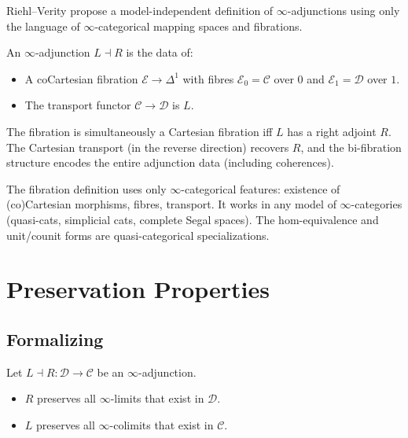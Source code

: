 Riehl–Verity propose a model-independent definition of $\infty$-adjunctions
using only the language of $\infty$-categorical mapping spaces and
fibrations.

\begin{definition}
\label{def:adjunction-fibration}
An $\infty$-adjunction $L \dashv R$ is the data of:
\begin{itemize}
  \item A coCartesian fibration $\mathcal{E} \to \Delta^1$ with fibres
        $\mathcal{E}_0 = \mathcal{C}$ over $0$ and $\mathcal{E}_1 = \mathcal{D}$
        over $1$.
  \item The transport functor $\mathcal{C} \to \mathcal{D}$ is $L$.
\end{itemize}
The fibration is simultaneously a Cartesian fibration iff $L$ has a
right adjoint $R$. The Cartesian transport (in the reverse direction)
recovers $R$, and the bi-fibration structure encodes the entire
adjunction data (including coherences).
\end{definition}

\begin{remark}
The fibration definition uses only $\infty$-categorical features:
existence of (co)Cartesian morphisms, fibres, transport. It works in any
model of $\infty$-categories (quasi-cats, simplicial cats, complete Segal
spaces). The hom-equivalence and unit/counit forms are quasi-categorical
specializations.
\end{remark}


\section{Preservation Properties}
\label{sec:adjunction-preservation}

\subsection{Formalizing}

\begin{theorem}
\label{thm:rapl-lapc-infty}
Let $L \dashv R : \mathcal{D} \to \mathcal{C}$ be an $\infty$-adjunction.
\begin{itemize}
  \item $R$ preserves all $\infty$-limits that exist in $\mathcal{D}$.
  \item $L$ preserves all $\infty$-colimits that exist in $\mathcal{C}$.
\end{itemize}
\end{theorem}


